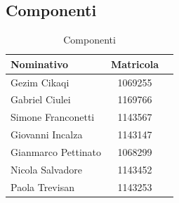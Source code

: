 \subsection{Componenti}
\begin{longtable}{|p{5cm}|c|c|}
	\arrayrulecolor{white}
	\caption{Componenti}
	\hline
	\rowcolor{header}
	\textbf{Nominativo} & \textbf{Matricola}
	\tabularnewline
	\endfirsthead
	\hline
	Gezim Cikaqi & 1069255 \\
	Gabriel Ciulei & 1169766 \\
	Simone Franconetti & 1143567\\
	Giovanni Incalza & 1143147 \\
	Gianmarco Pettinato & 1068299 \\
	Nicola Salvadore & 1143452 \\
	Paola Trevisan & 1143253\\
	\hline
	
\end{longtable}